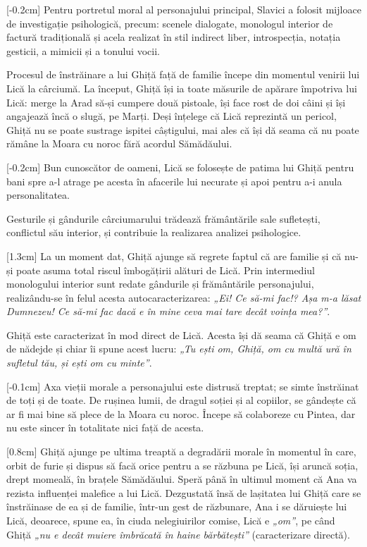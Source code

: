 [-0.2cm]
Pentru portretul moral al personajului principal, Slavici a folosit mijloace de investigație psihologică, precum: scenele dialogate, monologul interior de factură tradițională și acela realizat în stil indirect liber, introspecția, notația gesticii, a mimicii și a tonului vocii.

Procesul de înstrăinare a lui Ghiță față de familie începe din momentul venirii lui Lică la cârciumă. La început, Ghiță își ia toate măsurile de apărare împotriva lui Lică: merge la Arad să-și cumpere două pistoale, își face rost de doi câini și își angajează încă o slugă, pe Marți. Deși înțelege că Lică reprezintă un pericol, Ghiță nu se poate sustrage ispitei câștigului, mai ales că își dă seama că nu poate rămâne la Moara cu noroc fără acordul Sămădăului.

[-0.2cm]
Bun cunoscător de oameni, Lică se folosește de patima lui Ghiță pentru bani spre a-l atrage pe acesta în afacerile lui necurate și apoi pentru a-i anula personalitatea.

Gesturile și gândurile cârciumarului trădează frământările sale sufletești, conflictul său interior, și contribuie la realizarea analizei psihologice.

[1.3cm]
La un moment dat, Ghiță ajunge să regrete faptul că are familie și că nu-și poate asuma total riscul îmbogățirii alături de Lică. Prin intermediul monologului interior sunt redate gândurile și frământările personajului, realizându-se în felul acesta autocaracterizarea: \textit{„Ei! Ce să-mi fac!? Așa m-a lăsat Dumnezeu! Ce să-mi fac dacă e în mine ceva mai tare decât voința mea?”}.

Ghiță este caracterizat în mod direct de Lică. Acesta își dă seama că Ghiță e om de nădejde și chiar îi spune acest lucru: \textit{„Tu ești om, Ghiță, om cu multă ură în sufletul tău, și ești om cu minte”}.

[-0.1cm]
Axa vieții morale a personajului este distrusă treptat; se simte înstrăinat de toți și de toate. De rușinea lumii, de dragul soției și al copiilor, se gândește că ar fi mai bine să plece de la Moara cu noroc. Începe să colaboreze cu Pintea, dar nu este sincer în totalitate nici față de acesta.

[0.8cm]
Ghiță ajunge pe ultima treaptă a degradării morale în momentul în care, orbit de furie și dispus să facă orice pentru a se răzbuna pe Lică, își aruncă soția, drept momeală, în brațele Sămădăului. Speră până în ultimul moment că Ana va rezista influenței malefice a lui Lică. Dezgustată însă de lașitatea lui Ghiță care se înstrăinase de ea și de familie, într-un gest de răzbunare, Ana i se dăruiește lui Lică, deoarece, spune ea, în ciuda nelegiuirilor comise, Lică e \textit{„om”}, pe când Ghiță \textit{„nu e decât muiere îmbrăcată în haine bărbătești”} (caracterizare directă).

